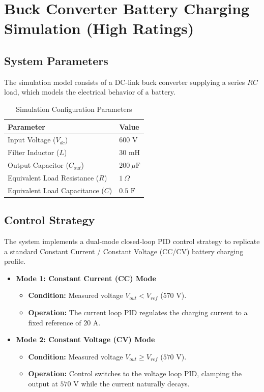 \section{Buck Converter Battery Charging Simulation (High Ratings)} %

\subsection{System Parameters} %
The simulation model consists of a DC-link buck converter supplying a series $RC$ load, which models the electrical behavior of a battery.

\begin{table}[h!]
\centering
\caption{Simulation Configuration Parameters}
\label{tab:parameters}
\begin{tabular}{ll}
\toprule
\textbf{Parameter} & \textbf{Value} \\ 
\midrule
Input Voltage ($V_{dc}$) & $600\text{ V}$ \\
Filter Inductor ($L$) & $30\text{ mH}$ \\
Output Capacitor ($C_{out}$) & $200\ \mu\text{F}$ \\
Equivalent Load Resistance ($R$) & $1\ \Omega$ \\
Equivalent Load Capacitance ($C$) & $0.5\text{ F}$ \\
\bottomrule
\end{tabular}
\end{table}

\subsection{Control Strategy} %
The system implements a dual-mode closed-loop PID control strategy to replicate a standard Constant Current / Constant Voltage (CC/CV) battery charging profile.

\begin{itemize}
    \item \textbf{Mode 1: Constant Current (CC) Mode}
    \begin{itemize}
        \item \textbf{Condition:} Measured voltage $V_{out} < V_{ref}$ ($570\text{ V}$).
        \item \textbf{Operation:} The current loop PID regulates the charging current to a fixed reference of $20\text{ A}$.
    \end{itemize}
    
    \item \textbf{Mode 2: Constant Voltage (CV) Mode}
    \begin{itemize}
        \item \textbf{Condition:} Measured voltage $V_{out} \ge V_{ref}$ ($570\text{ V}$).
        \item \textbf{Operation:} Control switches to the voltage loop PID, clamping the output at $570\text{ V}$ while the current naturally decays.
    \end{itemize}
\end{itemize}

